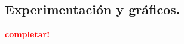 
\newpage \subsection{Experimentación y gráficos.}
\vspace*{0.3cm}

\textcolor{red}{\textbf{completar!}}
